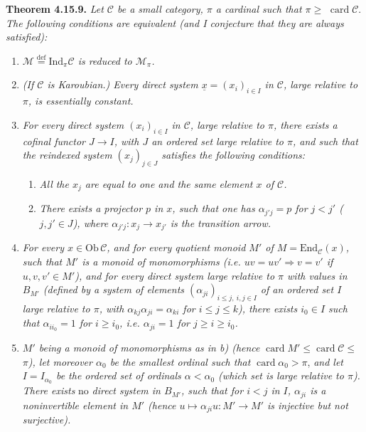 \documentclass[11pt]{article}
\newcommand{\msp}[1]{\marginpar{\footnotesize [#1]}}
\newcommand{\card}{\operatorname{card}}
\begin{document}
\textbf{Theorem 4.15.9.} \textit{Let $\mathcal{C}$ be a small category, $\pi$ a cardinal such that $\pi \geqslant$} $\card\mathcal{C}$. \textit{The following conditions are equivalent (and I conjecture that they are always satisfied):}
\begin{enumerate}[nosep]
\item[\textit{a)}] \textit{$\mathcal{M} \overset{\text{def}}{=} \mathrm{Ind}_\pi\mathcal{C}$ is reduced to $\mathcal{M}_\pi$.}
\item[\textit{a$'$)}] \textit{(If $\mathcal{C}$ is Karoubian.) Every direct system $\underline{x} = (x_i)_{i\in I}$ in $\mathcal{C}$, large relative to $\pi$, is essentially constant.}
\item[\textit{a$''$)}] \textit{For every direct system $(x_i)_{i\in I}$ in $\mathcal{C}$, large relative to $\pi$, there exists a cofinal functor $J \longrightarrow I$, with $J$ an ordered set large relative to $\pi$, and such that the reindexed system $(x_j)_{j\in J}$ satisfies the following conditions:}
\begin{enumerate}[nosep]
\item[\textit{1)}] \textit{All the $x_j$ are equal to one and the same element $x$ of $\mathcal{C}$.}
\item[\textit{2)}] \textit{There exists a projector $p$ in $x$, such that one has $\alpha_{j'j} = p$ for $j < j'$ ($j,j' \in J$), where $\alpha_{j'j} : x_j \longrightarrow x_{j'}$ is the transition arrow.}
\end{enumerate}
\item[\textit{b)}] \textit{For every $x \in \mathrm{Ob}\,\mathcal{C}$, and for every quotient monoid $M'$ of $M = \mathrm{End}_{\mathcal{C}}(x)$, such that $M'$ is a monoid of monomorphisms (i.e. $uv = uv' \Longrightarrow v = v'$ if $u,v,v' \in M'$), and for every direct system large relative to $\pi$ with values in $B_{M'}$ (defined by a system of elements $(\alpha_{ji})_{i\leqslant j,\ i,j\in I}$ of an ordered set $I$ large relative to $\pi$, with $\alpha_{kj}\alpha_{ji} = \alpha_{ki}$ for $i \leqslant j \leqslant k$), there exists $i_0 \in I$ such}
\msp{page 462}
\textit{that $\alpha_{ii_0} = 1$ for $i \geqslant i_0$, i.e. $\alpha_{ji} = 1$ for $j \geqslant i \geqslant i_0$.}
\item[\textit{b$'$)}] \textit{$M'$ being a monoid of monomorphisms as in b) (hence} $\card M' \leqslant \card\mathcal{C} \leqslant$ \textit{$\pi$), let moreover $\alpha_0$ be the smallest ordinal such that} $\card\alpha_0 > \pi$, \textit{and let $I = I_{\alpha_0}$ be the ordered set of ordinals $\alpha < \alpha_0$ (which set is large relative to $\pi$). There exists} no \textit{direct system in $B_{M'}$, such that for $i < j$ in $I$, $\alpha_{ji}$ is a noninvertible element in $M'$ (hence $u \longmapsto \alpha_{ji}u : M' \longrightarrow M'$ is injective but not surjective).}
\end{enumerate}
\end{document}
